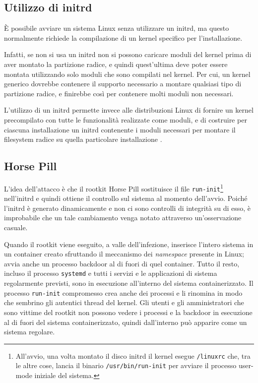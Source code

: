 \documentclass{article}
\begin{document}
\subsection{Utilizzo di initrd}
È possibile avviare un sistema Linux senza utilizzare un initrd, ma questo normalmente richiede la compilazione di un kernel specifico per l'installazione.

Infatti, se non si usa un initrd non si possono caricare moduli del kernel prima di aver montato la partizione radice, e quindi quest'ultima deve poter essere montata utilizzando solo moduli che sono compilati nel kernel. Per cui, un kernel generico dovrebbe contenere il supporto necessario a montare qualsiasi tipo di partizione radice, e finirebbe così per contenere molti moduli non necessari.

L'utilizzo di un initrd permette invece alle distribuzioni Linux di fornire un kernel precompilato con tutte le funzionalità realizzate come moduli, e di costruire per ciascuna installazione un initrd contenente i moduli necessari per montare il filesystem radice su quella particolare installazione \cite{initrd}.

\subsection{Horse Pill}
L'idea dell'attacco è che il rootkit Horse Pill sostituisce il file \texttt{run-init}\footnote{All'avvio, una volta montato il disco initrd il kernel esegue \texttt{/linuxrc} che, tra le altre cose, lancia il binario \texttt{/usr/bin/run-init} per avviare il processo user-mode iniziale del sistema.} nell'initrd e quindi ottiene il controllo sul sistema al momento dell'avvio. Poiché l'initrd è generato dinamicamente e non ci sono controlli di integrità su di esso, è improbabile che un tale cambiamento venga notato attraverso un'osservazione casuale.

Quando il rootkit viene eseguito, a valle dell'infezione, inserisce l'intero sistema in un container creato sfruttando il meccanismo dei \textsl{namespace} presente in Linux; avvia anche un processo backdoor al di fuori di quel container. Tutto il resto, incluso il processo \texttt{systemd} e tutti i servizi e le applicazioni di sistema regolarmente previsti, sono in esecuzione all'interno del sistema containerizzato. Il processo \texttt{run-init} compromesso crea anche dei processi e li rinomina in modo che sembrino gli autentici thread del kernel. Gli utenti e gli amministratori che sono vittime del rootkit non possono vedere i processi e la backdoor in esecuzione al di fuori del sistema containerizzato, quindi dall'interno può apparire come un sistema regolare.
\end{document}

